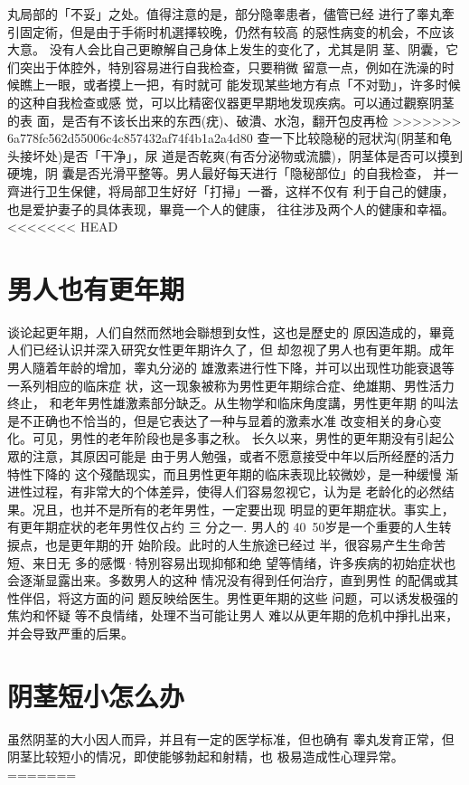\documentclass[12pt,UTF8]{ctexbook}
\begin{document}
丸局部的「不妥」之处。值得注意的是，部分隐睾患者，儘管已经
进行了睾丸牽引固定術，但是由于手術时机選擇较晚，仍然有较高
的惡性病变的机会，不应该大意。
没有人会比自己更瞭解自己身体上发生的变化了，尤其是阴
茎、阴囊，它们突出于体腔外，特別容易进行自我检查，只要稍微
留意一点，例如在洗澡的时候瞧上一眼，或者摸上一把，有时就可
能发现某些地方有点「不对勁」，许多时候的这种自我检查或感
觉，可以比精密仪器更早期地发现疾病。可以通过觀察阴茎的表
面，是否有不该长出来的东西(疣)、破潰、水泡，翻开包皮再检
>>>>>>> 6a778fc562d55006c4c857432af74f4b1a2a4d80
查一下比较隐秘的冠状沟(阴茎和龟头接坏处)是否「干净」，尿
道是否乾爽(有否分泌物或流膿)，阴茎体是否可以摸到硬塊，阴
囊是否光滑平整等。男人最好每天进行「隐秘部位」的自我检查，
并一齊进行卫生保健，将局部卫生好好「打掃」一番，这样不仅有
利于自己的健康，也是爱护妻子的具体表现，畢竟一个人的健康，
往往涉及两个人的健康和幸福。
<<<<<<< HEAD

\section{男人也有更年期}
谈论起更年期，人们自然而然地会聯想到女性，这也是歷史的
原因造成的，畢竟人们已经认识并深入研究女性更年期许久了，但
却忽视了男人也有更年期。成年男人隨着年龄的增加，睾丸分泌的
雄激素进行性下降，并可以出现性功能衰退等一系列相应的临床症
状，这一现象被称为男性更年期综合症、绝雄期、男性活力终止，
和老年男性雄激素部分缺乏。从生物学和临床角度講，男性更年期
的叫法是不正确也不恰当的，但是它表达了一种与显着的激素水准
改变相关的身心变化。可见，男性的老年阶段也是多事之秋。
长久以来，男性的更年期没有引起公眾的注意，其原因可能是
由于男人勉强，或者不愿意接受中年以后所经歷的活力特性下降的
这个殘酷现实，而且男性更年期的临床表现比较微妙，是一种缓慢
渐进性过程，有非常大的个体差异，使得人们容易忽视它，认为是
老龄化的必然结果。况且，也并不是所有的老年男性，一定要出现
明显的更年期症状。事实上，有更年期症状的老年男性仅占约 三
分之一.
男人的 40~50岁是一个重要的人生转捩点，也是更年期的开
始阶段。此时的人生旅途已经过
半，很容易产生生命苦短、来日无
多的感慨·特別容易出现抑郁和绝
望等情绪，许多疾病的初始症状也
会逐渐显露出来。多数男人的这种
情况没有得到任何治疗，直到男性
的配偶或其性伴侣，将这方面的问
题反映给医生。男性更年期的这些
问题，可以诱发极强的焦灼和怀疑
等不良情绪，处理不当可能让男人
难以从更年期的危机中掙扎出来，
并会导致严重的后果。

\section{阴茎短小怎么办}
虽然阴茎的大小因人而异，并且有一定的医学标准，但也确有
睾丸发育正常，但阴茎比较短小的情况，即使能够勃起和射精，也
极易造成性心理异常。
=======
\end{document}
